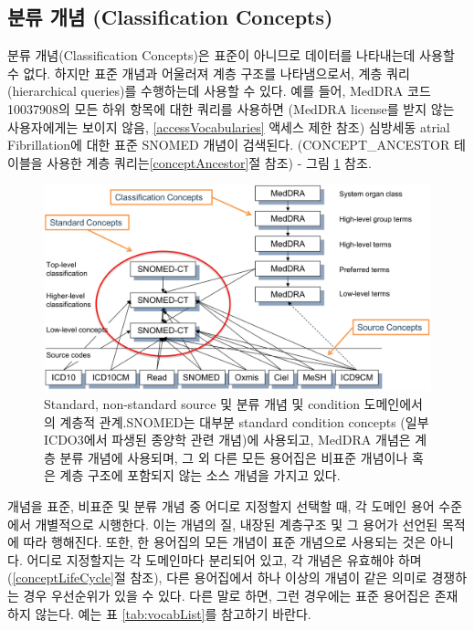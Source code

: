 \documentclass[11pt]{book}
\theoremstyle{definition}
\theoremstyle{definition}
\theoremstyle{definition}
\theoremstyle{remark}
\begin{document}
\subsection{분류 개념 (Classification
Concepts)}\label{--classification-concepts}

분류 개념(Classification Concepts)은 표준이 아니므로 데이터를 나타내는데
사용할 수 없다. 하지만 표준 개념과 어울러져 계층 구조를 나타냄으로서,
계층 쿼리(hierarchical queries)를 수행하는데 사용할 수 있다. 예를 들어,
MedDRA 코드 10037908의 모든 하위 항목에 대한 쿼리를 사용하면 (MedDRA
license를 받지 않는 사용자에게는 보이지 않음, \ref{accessVocabularies}
액세스 제한 참조) 심방세동 atrial Fibrillation에 대한 표준 SNOMED 개념이
검색된다. (CONCEPT\_ANCESTOR 테이블을 사용한 계층
쿼리는\ref{conceptAncestor}절 참조) - 그림 \ref{fig:hierarchy} 참조.

\begin{figure}

{\centering \includegraphics[width=1\linewidth]{images/StandardizedVocabularies/hierarchy} 

}

\caption{Standard, non-standard source 및 분류 개념 및 condition 도메인에서의 계층적 관계.SNOMED는 대부분 standard condition concepts (일부 ICDO3에서 파생된 종양학 관련 개념)에 사용되고, MedDRA 개념은 계층 분류 개념에 사용되며, 그 외 다른 모든 용어집은 비표준 개념이나 혹은 계층 구조에 포함되지 않는 소스 개념을 가지고 있다.}\label{fig:hierarchy}
\end{figure}

개념을 표준, 비표준 및 분류 개념 중 어디로 지정할지 선택할 때, 각 도메인
용어 수준에서 개별적으로 시행한다. 이는 개념의 질, 내장된 계층구조 및 그
용어가 선언된 목적에 따라 행해진다. 또한, 한 용어집의 모든 개념이 표준
개념으로 사용되는 것은 아니다. 어디로 지정할지는 각 도메인마다 분리되어
있고, 각 개념은 유효해야 하며 (\ref{conceptLifeCycle}절 참조), 다른
용어집에서 하나 이상의 개념이 같은 의미로 경쟁하는 경우 우선순위가 있을
수 있다. 다른 말로 하면, 그런 경우에는 표준 용어집은 존재하지 않는다.
예는 표 \ref{tab:vocabList}를 참고하기 바란다.
\end{document}
